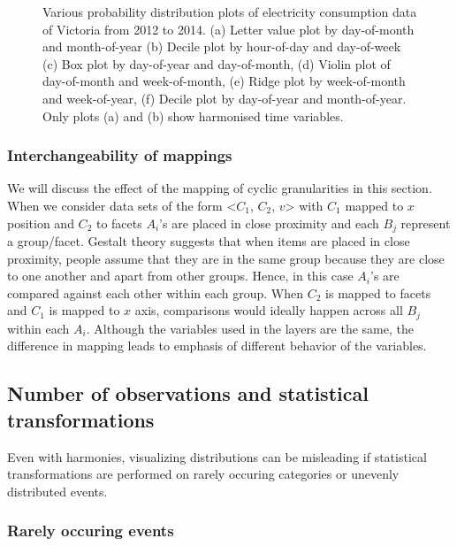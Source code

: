 \documentclass[12pt]{article}
\begin{document}
\begin{figure}
\caption{Various probability distribution plots of electricity consumption data of Victoria from 2012 to 2014. (a) Letter value plot by day-of-month and month-of-year (b) Decile plot by hour-of-day and day-of-week (c) Box plot by day-of-year and day-of-month, (d) Violin plot of day-of-month and week-of-month, (e) Ridge plot by week-of-month and week-of-year, (f) Decile plot by day-of-year and month-of-year. Only plots (a) and (b) show harmonised time variables.}\label{fig:allFig}
\end{figure}

\hypertarget{interchangeability-of-mappings}{%
\subsubsection{Interchangeability of mappings}\label{interchangeability-of-mappings}}

We will discuss the effect of the mapping of cyclic granularities in this section. When we consider data sets of the form \textless{}\(C_1\), \(C_2\), \(v\)\textgreater{} with \(C_1\) mapped to \(x\) position and \(C_2\) to facets \(A_i\)'s are placed in close proximity and each \(B_j\) represent a group/facet. Gestalt theory suggests that when items are placed in close proximity, people assume that they are in the same group because they are close to one another and apart from other groups. Hence, in this case \(A_i\)'s are compared against each other within each group. When \(C_2\) is mapped to facets and \(C_1\) is mapped to \(x\) axis, comparisons would ideally happen across all \(B_j\) within each \(A_i\). Although the variables used in the layers are the same, the difference in mapping leads to emphasis of different behavior of the variables.

\hypertarget{number-of-observations-and-statistical-transformations}{%
\subsection{Number of observations and statistical transformations}\label{number-of-observations-and-statistical-transformations}}

Even with harmonies, visualizing distributions can be misleading if statistical transformations are performed on rarely occuring categories or unevenly distributed events.

\hypertarget{rarely-occuring-events}{%
\subsubsection{Rarely occuring events}\label{rarely-occuring-events}}
\end{document}

